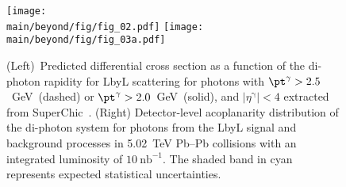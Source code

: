 \begin{figure}[!hbt]
\centering
\texttt{[image: \\main/beyond/fig/fig\_02.pdf]}
\texttt{[image: \\main/beyond/fig/fig\_03a.pdf]}
\caption{
(Left)~Predicted differential cross section as a function of the di-photon rapidity for LbyL scattering for photons with
$\pt^{\mathrm{\gamma}}>2.5$~GeV~(dashed) or $\pt^{\mathrm{\gamma}}>2.0$~GeV~(solid), and
$|\eta^{\mathrm{\gamma}}|<4$ extracted from SuperChic~\cite{Harland-Lang:2018iur}.
(Right) Detector-level acoplanarity distribution of the di-photon system for photons from the LbyL signal and background processes in
  5.02~TeV Pb--Pb collisions with an integrated luminosity of
  $10~\mathrm{nb}^{-1}$. The shaded band in cyan represents expected statistical uncertainties.
}
\label{fig:lbyl}
\end{figure}

